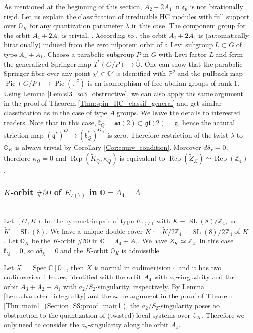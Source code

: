 \documentclass[12pt]{amsart}
\newcommand{\C}{\mathbb{C}}
\newcommand{\Orb}{\mathbb{O}}
\newcommand{\Z}{\mathbb{Z}}
\newcommand{\kf}{\mathfrak{k}}
\newcommand{\gl}{\mathfrak{gl}}
\newcommand{\q}{\mathfrak{q}}
\newcommand{\SL}{\operatorname{SL}}
\newcommand{\spec}{\operatorname{Spec}}
\theoremstyle{definition}
\numberwithin{equation}{section}
\begin{document}
 As mentioned at the beginning of this section, $A_2 + 2A_1$ in $\mathfrak{e}_6$ is not birationally rigid. Let us explain the classification of irreducible HC modules with full support over $\Orb_K$ for any quantization parameter $\lambda$ in this case. The component group
 for the orbit $A_2+2A_1$ is trivial, \cite[Section 8.4]{CM}. According to \cite[Table 6]{GraafElashvili}, the orbit $A_2 + 2A_1$ is (automatically birationally) induced from the zero nilpotent orbit of a Levi subgroup $L \subset G$ of type $A_4 + A_1$. Choose a parabolic subgroup $P$ in $G$ with Levi factor $L$ and form the generalized Springer map $T^*(G/P) \to \overline{\Orb}$. One can show that the parabolic Springer fiber over any point $\chi' \in \Orb'$ is identified with $\mathbb{P}^2$ and the pullback map $\operatorname{Pic}(G/P)\rightarrow
 \operatorname{Pic}(\mathbb{P}^2)$ is an isomorphism of free abelian groups of rank $1$. Using Lemma \ref{Lem:sl3_so3_obstructive}, we can also apply the same argument in the proof of Theorem \ref{Thm:spin_HC_classif_general} and get similar classification as in the case of type $A$ groups. We leave the details to interested readers. Note that in this case, $\kf_Q = \mathfrak{so}(2) \subset \gl(2) = \q$, hence the natural striction map $(\q^*)^Q \to (\mathfrak{k}_Q^*)^{K_Q}$ is zero. Therefore restriction of the twist $\lambda$ to $\Orb_K$ is always trivial by Corollary \ref{Cor:equiv_condition}. Moreover $d \delta_\chi = 0$, therefore $\kappa_Q=0$ and $\operatorname{Rep}(\tilde{K}_Q, \kappa_Q)$ is equivalent to $\operatorname{Rep}(\tilde{Z}_K) \simeq \operatorname{Rep}(\Z_4)$. 




\subsubsection{$K$-orbit $\# 50$ of $E_{7(7)}$ in $\Orb=A_4+A_1$}\label{SS:orbit_b} \, \\

Let $(G,K)$ be the symmetric pair of type $E_{7(7)}$ with $K = \SL(8) / \Z_4$, so $\tilde{K}=\SL(8)$. We have a unique double cover $\bar{K} := \tilde{K} / 2 \Z_4 = \SL(8) / 2\Z_4$ of $K$. Let $\Orb_K$ be the $K$-orbit $\# 50$ in $\Orb=A_4+A_1$. We have $Z_K \simeq \Z_4$. In this case $\kf_Q=0$, so $d\delta_\chi = 0$ and the $K$-orbit $\Orb_K$ is admissible.  

Let $X=\spec\C[\Orb]$, then $X$ is normal in codimenision $4$ and it has two codimension $4$ leaves, identified with the orbit $A_4$ with $a_2$-singualrity and the orbit $A_3 + A_2 + A_1$ with $a_2 /S_2$-singularity, respectively. By Lemma \ref{Lem:character_integrality} and the same argument in the proof of Theorem \ref{Thm:main1} (Section  \ref{SS:proof_main1}), the $a_2/S_2$-singularity poses no obstruction to the quantization of (twisted) local systems over $\Orb_K$. Therefore we only need to consider the $a_2$-singularity along the orbit $A_4$.
\end{document}
